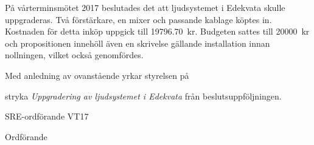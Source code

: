 \documentclass[../_main/handlingar.tex]{subfiles}
\begin{document}

På vårterminsmötet 2017 beslutades det att ljudsystemet i Edekvata skulle uppgraderas. Två förstärkare, en mixer och passande kablage köptes in. Kostnaden för detta inköp uppgick till \SI{19796.70}{kr}. Budgeten sattes till \SI{20000}{kr} och propositionen innehöll även en skrivelse gällande installation innan nollningen, vilket också genomfördes.


Med anledning av ovanstående yrkar styrelsen på

\begin{attsatser}
    \att stryka \emph{Uppgradering av ljudsystemet i Edekvata} från beslutsuppföljningen.
\end{attsatser}

\begin{signatures}{2}
    \ist
	\signature{Pontus Landgren}{SRE-ordförande VT17}
    \signature{\ordf}{Ordförande}
\end{signatures}
\end{document}
